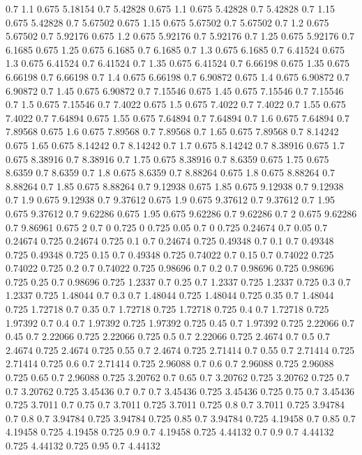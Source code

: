 0.7 1.1
0.675 5.18154
0.7 5.42828
0.675 1.1
0.675 5.42828
0.7 5.42828
0.7 1.15
0.675 5.42828
0.7 5.67502
0.675 1.15
0.675 5.67502
0.7 5.67502
0.7 1.2
0.675 5.67502
0.7 5.92176
0.675 1.2
0.675 5.92176
0.7 5.92176
0.7 1.25
0.675 5.92176
0.7 6.1685
0.675 1.25
0.675 6.1685
0.7 6.1685
0.7 1.3
0.675 6.1685
0.7 6.41524
0.675 1.3
0.675 6.41524
0.7 6.41524
0.7 1.35
0.675 6.41524
0.7 6.66198
0.675 1.35
0.675 6.66198
0.7 6.66198
0.7 1.4
0.675 6.66198
0.7 6.90872
0.675 1.4
0.675 6.90872
0.7 6.90872
0.7 1.45
0.675 6.90872
0.7 7.15546
0.675 1.45
0.675 7.15546
0.7 7.15546
0.7 1.5
0.675 7.15546
0.7 7.4022
0.675 1.5
0.675 7.4022
0.7 7.4022
0.7 1.55
0.675 7.4022
0.7 7.64894
0.675 1.55
0.675 7.64894
0.7 7.64894
0.7 1.6
0.675 7.64894
0.7 7.89568
0.675 1.6
0.675 7.89568
0.7 7.89568
0.7 1.65
0.675 7.89568
0.7 8.14242
0.675 1.65
0.675 8.14242
0.7 8.14242
0.7 1.7
0.675 8.14242
0.7 8.38916
0.675 1.7
0.675 8.38916
0.7 8.38916
0.7 1.75
0.675 8.38916
0.7 8.6359
0.675 1.75
0.675 8.6359
0.7 8.6359
0.7 1.8
0.675 8.6359
0.7 8.88264
0.675 1.8
0.675 8.88264
0.7 8.88264
0.7 1.85
0.675 8.88264
0.7 9.12938
0.675 1.85
0.675 9.12938
0.7 9.12938
0.7 1.9
0.675 9.12938
0.7 9.37612
0.675 1.9
0.675 9.37612
0.7 9.37612
0.7 1.95
0.675 9.37612
0.7 9.62286
0.675 1.95
0.675 9.62286
0.7 9.62286
0.7 2
0.675 9.62286
0.7 9.86961
0.675 2
0.7 0
0.725 0
0.725 0.05
0.7 0
0.725 0.24674
0.7 0.05
0.7 0.24674
0.725 0.24674
0.725 0.1
0.7 0.24674
0.725 0.49348
0.7 0.1
0.7 0.49348
0.725 0.49348
0.725 0.15
0.7 0.49348
0.725 0.74022
0.7 0.15
0.7 0.74022
0.725 0.74022
0.725 0.2
0.7 0.74022
0.725 0.98696
0.7 0.2
0.7 0.98696
0.725 0.98696
0.725 0.25
0.7 0.98696
0.725 1.2337
0.7 0.25
0.7 1.2337
0.725 1.2337
0.725 0.3
0.7 1.2337
0.725 1.48044
0.7 0.3
0.7 1.48044
0.725 1.48044
0.725 0.35
0.7 1.48044
0.725 1.72718
0.7 0.35
0.7 1.72718
0.725 1.72718
0.725 0.4
0.7 1.72718
0.725 1.97392
0.7 0.4
0.7 1.97392
0.725 1.97392
0.725 0.45
0.7 1.97392
0.725 2.22066
0.7 0.45
0.7 2.22066
0.725 2.22066
0.725 0.5
0.7 2.22066
0.725 2.4674
0.7 0.5
0.7 2.4674
0.725 2.4674
0.725 0.55
0.7 2.4674
0.725 2.71414
0.7 0.55
0.7 2.71414
0.725 2.71414
0.725 0.6
0.7 2.71414
0.725 2.96088
0.7 0.6
0.7 2.96088
0.725 2.96088
0.725 0.65
0.7 2.96088
0.725 3.20762
0.7 0.65
0.7 3.20762
0.725 3.20762
0.725 0.7
0.7 3.20762
0.725 3.45436
0.7 0.7
0.7 3.45436
0.725 3.45436
0.725 0.75
0.7 3.45436
0.725 3.7011
0.7 0.75
0.7 3.7011
0.725 3.7011
0.725 0.8
0.7 3.7011
0.725 3.94784
0.7 0.8
0.7 3.94784
0.725 3.94784
0.725 0.85
0.7 3.94784
0.725 4.19458
0.7 0.85
0.7 4.19458
0.725 4.19458
0.725 0.9
0.7 4.19458
0.725 4.44132
0.7 0.9
0.7 4.44132
0.725 4.44132
0.725 0.95
0.7 4.44132
